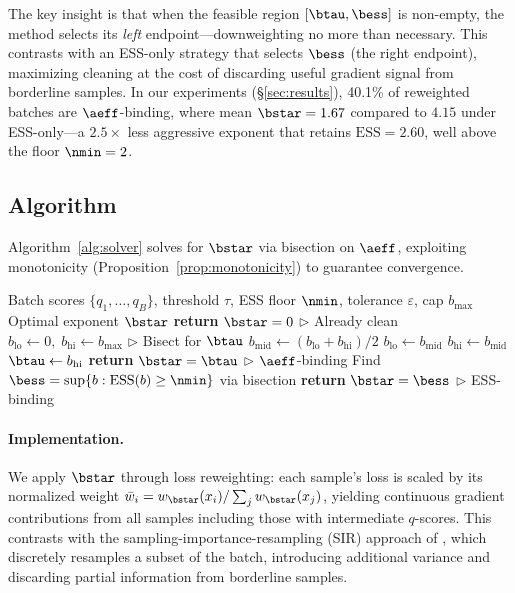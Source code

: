 The key insight is that when the feasible region $[\btau, \bess]$ is non-empty, the method selects its \emph{left} endpoint---downweighting no more than necessary.
This contrasts with an ESS-only strategy that selects $\bess$ (the right endpoint), maximizing cleaning at the cost of discarding useful gradient signal from borderline samples.
In our experiments (\S\ref{sec:results}), 40.1\% of reweighted batches are $\aeff$-binding, where mean $\bstar = 1.67$ compared to $4.15$ under ESS-only---a $2.5\times$ less aggressive exponent that retains $\mathrm{ESS} = 2.60$, well above the floor $\nmin = 2$.

\subsection{Algorithm}
\label{sec:algorithm}

Algorithm~\ref{alg:solver} solves for $\bstar$ via bisection on $\aeff$, exploiting monotonicity (Proposition~\ref{prop:monotonicity}) to guarantee convergence.

\begin{algorithm}[t]
\caption{Per-batch adaptive exponent solver}
\label{alg:solver}
\begin{algorithmic}[1]
\REQUIRE Batch scores $\{q_1, \ldots, q_B\}$, threshold $\tau$, ESS floor $\nmin$, tolerance $\varepsilon$, cap $b_{\max}$
\ENSURE Optimal exponent $\bstar$
  \STATE \textbf{return} $\bstar = 0$ \hfill $\triangleright$ Already clean
\ENDIF
\STATE $b_{\mathrm{lo}} \leftarrow 0,\; b_{\mathrm{hi}} \leftarrow b_{\max}$ \hfill $\triangleright$ Bisect for $\btau$
  \STATE $b_{\mathrm{mid}} \leftarrow (b_{\mathrm{lo}} + b_{\mathrm{hi}}) / 2$
    \STATE $b_{\mathrm{lo}} \leftarrow b_{\mathrm{mid}}$
  \ELSE
    \STATE $b_{\mathrm{hi}} \leftarrow b_{\mathrm{mid}}$
  \ENDIF
\ENDWHILE
\STATE $\btau \leftarrow b_{\mathrm{hi}}$
  \STATE \textbf{return} $\bstar = \btau$ \hfill $\triangleright$ $\aeff$-binding
\ELSE
  \STATE Find $\bess = \sup\{b : \mathrm{ESS}(b) \geq \nmin\}$ via bisection
  \STATE \textbf{return} $\bstar = \bess$ \hfill $\triangleright$ ESS-binding
\ENDIF
\end{algorithmic}
\end{algorithm}

\paragraph{Implementation.}
We apply $\bstar$ through loss reweighting: each sample's loss is scaled by its normalized weight $\bar{w}_i = w_{\bstar}(x_i) / \sum_j w_{\bstar}(x_j)$, yielding continuous gradient contributions from all samples including those with intermediate $q$-scores.
This contrasts with the sampling-importance-resampling (SIR) approach of \citet{drayson_2025_detection_collapse}, which discretely resamples a subset of the batch, introducing additional variance and discarding partial information from borderline samples.

